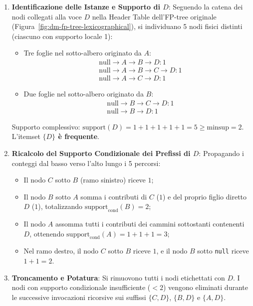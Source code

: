 \begin{enumerate}[label=\textbf{\arabic*.}]
    \item \textbf{Identificazione delle Istanze e Supporto di $D$}:
    Seguendo la catena dei nodi collegati alla voce $D$ nella Header Table dell'FP-tree originale (Figura~\ref{fig:dm-fp-tree-lexicographical}), si individuano 5 nodi fisici distinti (ciascuno con supporto locale 1):
    \begin{itemize}
        \item Tre foglie nel sotto-albero originato da $A$:
        \begin{align}
        &\text{null} \to A \to B \to D:1 \\
        &\text{null} \to A \to B \to C \to D:1 \\
        &\text{null} \to A \to C \to D:1
        \end{align}
        \item Due foglie nel sotto-albero originato da $B$:
        \begin{align}
        &\text{null} \to B \to C \to D:1 \\
        &\text{null} \to B \to D:1
        \end{align}
    \end{itemize}
    Supporto complessivo: $\text{support}(D) = 1 + 1 + 1 + 1 + 1 = 5 \ge \text{minsup} = 2$. L'itemset \textbf{$\{D\}$ è frequente}.

    \item \textbf{Ricalcolo del Supporto Condizionale dei Prefissi di $D$}:
    Propagando i conteggi dal basso verso l'alto lungo i 5 percorsi:
    \begin{itemize}
        \item Il nodo $C$ sotto $B$ (ramo sinistro) riceve $1$;
        \item Il nodo $B$ sotto $A$ somma i contributi di $C$ ($1$) e del proprio figlio diretto $D$ ($1$), totalizzando $\text{support}_{\text{cond}}(B) = 2$;
        \item Il nodo $A$ assomma tutti i contributi dei cammini sottostanti contenenti $D$, ottenendo $\text{support}_{\text{cond}}(A) = 1 + 1 + 1 = 3$;
        \item Nel ramo destro, il nodo $C$ sotto $B$ riceve $1$, e il nodo $B$ sotto \texttt{null} riceve $1 + 1 = 2$.
    \end{itemize}

    \item \textbf{Troncamento e Potatura}:
    Si rimuovono tutti i nodi etichettati con $D$. I nodi con supporto condizionale insufficiente ($< 2$) vengono eliminati durante le successive invocazioni ricorsive sui suffissi $\{C, D\}$, $\{B, D\}$ e $\{A, D\}$.
\end{enumerate}

